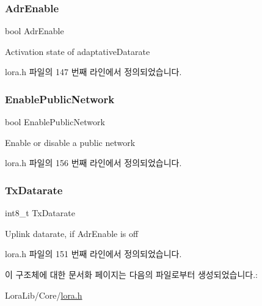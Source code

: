 \subsubsection{\texorpdfstring{Adr\+Enable}{AdrEnable}}
{\footnotesize\ttfamily bool Adr\+Enable}



Activation state of adaptative\+Datarate 



lora.\+h 파일의 147 번째 라인에서 정의되었습니다.

\mbox{\label{structs_lo_ra_param_aff3bd8c7ac1d2fe36ed22c15c25273aa}} 
\subsubsection{\texorpdfstring{Enable\+Public\+Network}{EnablePublicNetwork}}
{\footnotesize\ttfamily bool Enable\+Public\+Network}



Enable or disable a public network 



lora.\+h 파일의 156 번째 라인에서 정의되었습니다.

\mbox{\label{structs_lo_ra_param_afc6f53fb662fc66362f998d1351e9c5a}} 
\subsubsection{\texorpdfstring{Tx\+Datarate}{TxDatarate}}
{\footnotesize\ttfamily int8\+\_\+t Tx\+Datarate}



Uplink datarate, if Adr\+Enable is off 



lora.\+h 파일의 151 번째 라인에서 정의되었습니다.



이 구조체에 대한 문서화 페이지는 다음의 파일로부터 생성되었습니다.\+:\begin{DoxyCompactItemize}
\item 
Lora\+Lib/\+Core/\mbox{\hyperlink{lora_8h}{lora.\+h}}\end{DoxyCompactItemize}
